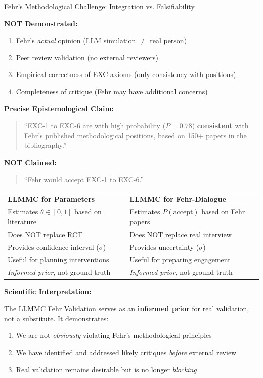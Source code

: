 \begin{chapter}{Fehr's Methodological Challenge: Integration vs. Falsifiability}
\begin{tcolorbox}[colback=blue!5!white,colframe=blue!75!black,title=\textbf{What LLMMC Synthetic Validation Shows}]
\textbf{NOT Demonstrated:}
\begin{enumerate}[noitemsep]
    \item Fehr's \textit{actual} opinion (LLM simulation $\neq$ real person)
    \item Peer review validation (no external reviewers)
    \item Empirical correctness of EXC axioms (only consistency with positions)
    \item Completeness of critique (Fehr may have additional concerns)
\end{enumerate}
\end{tcolorbox}

\textbf{Precise Epistemological Claim:}
\begin{quote}
``EXC-1 to EXC-6 are with high probability ($P = 0.78$) \textbf{consistent} with Fehr's published methodological positions, based on 150+ papers in the bibliography.''
\end{quote}

\textbf{NOT Claimed:}
\begin{quote}
``Fehr would accept EXC-1 to EXC-6.''
\end{quote}

\begin{tcolorbox}[colback=gray!5!white,colframe=gray!75!black,title=\textbf{Analogy: LLMMC for Parameters vs. LLMMC for Dialogue}]
\begin{tabular}{|p{5.5cm}|p{5.5cm}|}
\hline
\textbf{LLMMC for Parameters} & \textbf{LLMMC for Fehr-Dialogue} \\
\hline
Estimates $\theta \in [0,1]$ based on literature & Estimates $P(\text{accept})$ based on Fehr papers \\
\hline
Does NOT replace RCT & Does NOT replace real interview \\
\hline
Provides confidence interval ($\sigma$) & Provides uncertainty ($\sigma$) \\
\hline
Useful for planning interventions & Useful for preparing engagement \\
\hline
\textit{Informed prior}, not ground truth & \textit{Informed prior}, not ground truth \\
\hline
\end{tabular}
\end{tcolorbox}

\textbf{Scientific Interpretation:}

The LLMMC Fehr Validation serves as an \textbf{informed prior} for real validation, not a substitute. It demonstrates:
\begin{enumerate}[noitemsep]
    \item We are not \textit{obviously} violating Fehr's methodological principles
    \item We have identified and addressed likely critiques \textit{before} external review
    \item Real validation remains desirable but is no longer \textit{blocking}
\end{enumerate}


\end{chapter}
